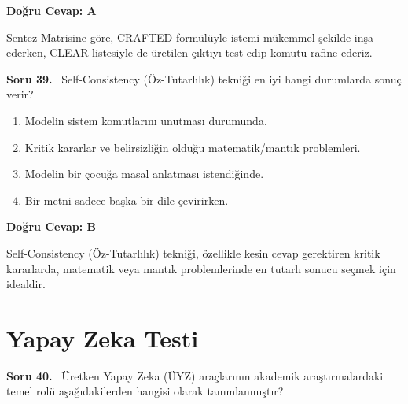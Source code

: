 \documentclass[11pt,a4paper,openany]{book}
\begin{document}
\vspace{4pt}
\begin{tcolorbox}[title=Cevap ve Açıklama, colback=gray!3!white, colframe=primarycolor!90!black, arc=2mm, fonttitle=\bfseries\sffamily, top=6pt, bottom=6pt]
    \textbf{Doğru Cevap: A}

    \vspace{2pt}
    Sentez Matrisine göre, CRAFTED formülüyle istemi mükemmel şekilde inşa ederken, CLEAR listesiyle de üretilen çıktıyı test edip komutu rafine ederiz.
\end{tcolorbox}
\vspace{10pt}
\needspace{5cm}
\vspace{8pt}
\noindent\textbf{\large\sffamily Soru 39.} \ Self-Consistency (Öz-Tutarlılık) tekniği en iyi hangi durumlarda sonuç verir?

\begin{enumerate}[label=\Alph*), leftmargin=25pt, topsep=4pt, itemsep=2pt]
        \item Modelin sistem komutlarını unutması durumunda.
        \item Kritik kararlar ve belirsizliğin olduğu matematik/mantık problemleri.
        \item Modelin bir çocuğa masal anlatması istendiğinde.
        \item Bir metni sadece başka bir dile çevirirken.
\end{enumerate}

\vspace{4pt}
\begin{tcolorbox}[title=Cevap ve Açıklama, colback=gray!3!white, colframe=primarycolor!90!black, arc=2mm, fonttitle=\bfseries\sffamily, top=6pt, bottom=6pt]
    \textbf{Doğru Cevap: B}

    \vspace{2pt}
    Self-Consistency (Öz-Tutarlılık) tekniği, özellikle kesin cevap gerektiren kritik kararlarda, matematik veya mantık problemlerinde en tutarlı sonucu seçmek için idealdir.
\end{tcolorbox}
\vspace{10pt}

\newpage
\section{Yapay Zeka Testi}
\needspace{5cm}
\vspace{8pt}
\noindent\textbf{\large\sffamily Soru 40.} \ Üretken Yapay Zeka (ÜYZ) araçlarının akademik araştırmalardaki temel rolü aşağıdakilerden hangisi olarak tanımlanmıştır?
\end{document}

